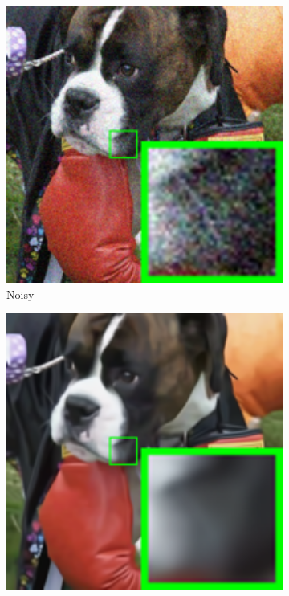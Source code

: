 
\begin{figure}
    \centering
    \begin{subfigure}[t]{0.24\textwidth}
        \centering
        \includegraphics[width=1\textwidth]{images/twsc/nc/resize_br_Noisy_dog.png}
		\caption{Noisy}
    \end{subfigure}
    \hfill
    \begin{subfigure}[t]{0.24\textwidth}
        \centering
        \includegraphics[width=1\textwidth]{images/twsc/nc/resize_br_CBM3D_dog.png}

\end{subfigure}
\end{figure}
